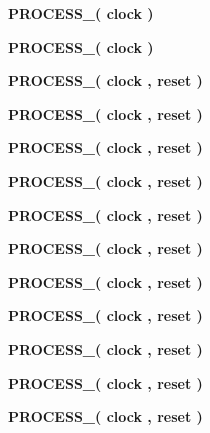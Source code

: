 \begin{DoxyCompactItemize}
\item 
{\bf P\+R\+O\+C\+E\+S\+S\+\_}{\bfseries  ( {\bfseries {\bfseries {\bf clock}} \textcolor{vhdlchar}{ }} )}
\item 
{\bf P\+R\+O\+C\+E\+S\+S\+\_}{\bfseries  ( {\bfseries {\bfseries {\bf clock}} \textcolor{vhdlchar}{ }} )}
\item 
{\bf P\+R\+O\+C\+E\+S\+S\+\_}{\bfseries  ( {\bfseries {\bfseries {\bf clock}} \textcolor{vhdlchar}{ }} , {\bfseries {\bfseries {\bf reset}} \textcolor{vhdlchar}{ }} )}
\item 
{\bf P\+R\+O\+C\+E\+S\+S\+\_}{\bfseries  ( {\bfseries {\bfseries {\bf clock}} \textcolor{vhdlchar}{ }} , {\bfseries {\bfseries {\bf reset}} \textcolor{vhdlchar}{ }} )}
\item 
{\bf P\+R\+O\+C\+E\+S\+S\+\_}{\bfseries  ( {\bfseries {\bfseries {\bf clock}} \textcolor{vhdlchar}{ }} , {\bfseries {\bfseries {\bf reset}} \textcolor{vhdlchar}{ }} )}
\item 
{\bf P\+R\+O\+C\+E\+S\+S\+\_}{\bfseries  ( {\bfseries {\bfseries {\bf clock}} \textcolor{vhdlchar}{ }} , {\bfseries {\bfseries {\bf reset}} \textcolor{vhdlchar}{ }} )}
\item 
{\bf P\+R\+O\+C\+E\+S\+S\+\_}{\bfseries  ( {\bfseries {\bfseries {\bf clock}} \textcolor{vhdlchar}{ }} , {\bfseries {\bfseries {\bf reset}} \textcolor{vhdlchar}{ }} )}
\item 
{\bf P\+R\+O\+C\+E\+S\+S\+\_}{\bfseries  ( {\bfseries {\bfseries {\bf clock}} \textcolor{vhdlchar}{ }} , {\bfseries {\bfseries {\bf reset}} \textcolor{vhdlchar}{ }} )}
\item 
{\bf P\+R\+O\+C\+E\+S\+S\+\_}{\bfseries  ( {\bfseries {\bfseries {\bf clock}} \textcolor{vhdlchar}{ }} , {\bfseries {\bfseries {\bf reset}} \textcolor{vhdlchar}{ }} )}
\item 
{\bf P\+R\+O\+C\+E\+S\+S\+\_}{\bfseries  ( {\bfseries {\bfseries {\bf clock}} \textcolor{vhdlchar}{ }} , {\bfseries {\bfseries {\bf reset}} \textcolor{vhdlchar}{ }} )}
\item 
{\bf P\+R\+O\+C\+E\+S\+S\+\_}{\bfseries  ( {\bfseries {\bfseries {\bf clock}} \textcolor{vhdlchar}{ }} , {\bfseries {\bfseries {\bf reset}} \textcolor{vhdlchar}{ }} )}
\item 
{\bf P\+R\+O\+C\+E\+S\+S\+\_}{\bfseries  ( {\bfseries {\bfseries {\bf clock}} \textcolor{vhdlchar}{ }} , {\bfseries {\bfseries {\bf reset}} \textcolor{vhdlchar}{ }} )}
\item 
{\bf P\+R\+O\+C\+E\+S\+S\+\_}{\bfseries  ( {\bfseries {\bfseries {\bf clock}} \textcolor{vhdlchar}{ }} , {\bfseries {\bfseries {\bf reset}} \textcolor{vhdlchar}{ }} )}

\end{DoxyCompactItemize}

